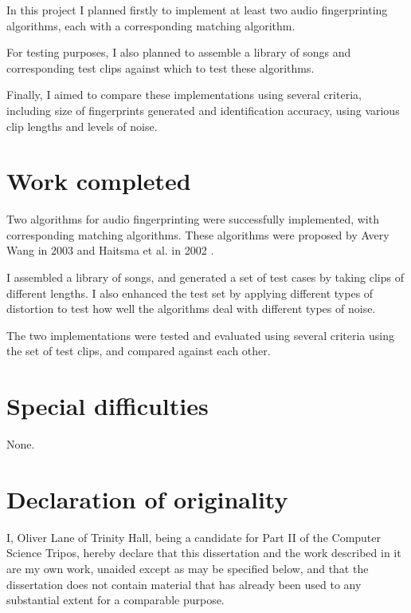 \documentclass[12pt,a4paper,twoside,openright]{report}
\begin{document}
In this project I planned firstly to implement at least two audio fingerprinting algorithms, each with a corresponding matching algorithm.

For testing purposes, I also planned to assemble a library of songs and corresponding test clips against which to test these algorithms.

Finally, I aimed to compare these implementations using several criteria, including size of fingerprints generated and identification accuracy, using various clip lengths and levels of noise.

\section*{Work completed}

Two algorithms for audio fingerprinting were successfully implemented, with corresponding matching algorithms. These algorithms were proposed by Avery Wang in 2003 \cite{Wang03} and Haitsma et al. in 2002 \cite{Haitsma02}. 

I assembled a library of songs, and generated a set of test cases by taking clips of different lengths. I also enhanced the test set by applying different types of distortion to test how well the algorithms deal with different types of noise.

The two implementations were tested and evaluated using several criteria using the set of test clips, and compared against each other.

\section*{Special difficulties}

None.

 
\newpage
\section*{Declaration of originality}

I, Oliver Lane of Trinity Hall, being a candidate for Part II of the Computer Science Tripos, hereby declare that this dissertation and the work described in  it are my own work, unaided except as may be specified below, and that the  dissertation does not contain material that has already been used to any substantial extent for a comparable purpose.

\bigskip
\bigskip
\bigskip


\bigskip
\bigskip
\end{document}
